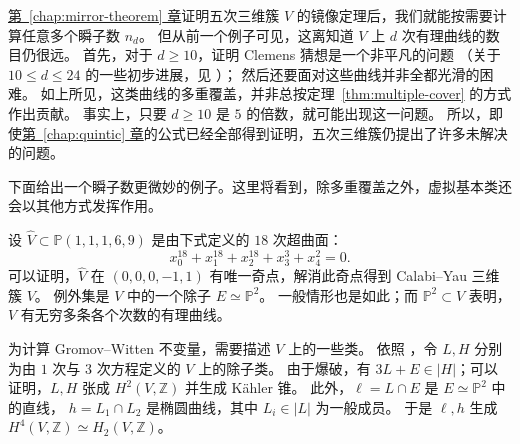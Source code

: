 \hyperref[chap:mirror-theorem]{第~\ref*{chap:mirror-theorem} 章}证明五次三维簇 $V$ 的镜像定理后，我们就能按需要计算任意多个瞬子数 $n_d$。
但从前一个例子可见，这离知道 $V$ 上 $d$ 次有理曲线的数目仍很远。
首先，对于 $d\geq10$，证明 Clemens 猜想是一个非平凡的问题
（关于 $10\leq d\leq24$ 的一些初步进展，见 ）；
然后还要面对这些曲线并非全都光滑的困难。
如上所见，这类曲线的多重覆盖，并非总按定理~\ref{thm:multiple-cover} 的方式作出贡献。
事实上，只要 $d\geq10$ 是 $5$ 的倍数，就可能出现这一问题。
所以，即使\hyperref[chap:quintic]{第~\ref*{chap:quintic} 章}的公式已经全部得到证明，五次三维簇仍提出了许多未解决的问题。

下面给出一个瞬子数更微妙的例子。这里将看到，除多重覆盖之外，虚拟基本类还会以其他方式发挥作用。
\begin{example}\label{ex:local-plane-instantons}
设 $\widehat V\subset\mathbb P(1,1,1,6,9)$ 是由下式定义的 $18$ 次超曲面：
\[
x_0^{18}+x_1^{18}+x_2^{18}+x_3^3+x_4^2=0.
\]
可以证明，$\widehat V$ 在 $(0,0,0,-1,1)$ 有唯一奇点，解消此奇点得到 Calabi--Yau 三维簇 $V$。
例外集是 $V$ 中的一个除子 $E\simeq\mathbb P^2$。
一般情形也是如此；而 $\mathbb P^2\subset V$ 表明，$V$ 有无穷多条各个次数的有理曲线。

为计算 Gromov--Witten 不变量，需要描述 $V$ 上的一些类。
依照 ，令 $L,H$ 分别为由 $1$ 次与 $3$ 次方程定义的 $V$ 上的除子类。
由于爆破，有 $3L+E\in|H|$；可以证明，$L,H$ 张成 $H^2(V,\mathbb Z)$ 并生成 Kähler 锥。
此外，$\ell=L\cap E$ 是 $E\simeq\mathbb P^2$ 中的直线，
$h=L_1\cap L_2$ 是椭圆曲线，其中 $L_i\in|L|$ 为一般成员。
于是 $\ell,h$ 生成 $H^4(V,\mathbb Z)\simeq H_2(V,\mathbb Z)$。


\end{example}
